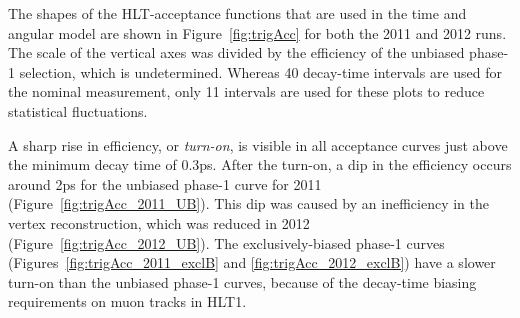 The shapes of the HLT-acceptance functions that are used in the time and angular model are shown in Figure~\ref{fig:trigAcc} for both the
2011 and 2012 runs. The scale of the vertical axes was divided by the efficiency of the unbiased phase-1 selection, which is undetermined.
Whereas 40 decay-time intervals are used for the nominal measurement, only 11 intervals are used for these plots to reduce statistical
fluctuations.

A sharp rise in efficiency, or \emph{turn-on}, is visible in all acceptance curves just above the minimum decay time of 0.3\unitsp{}ps.
After the turn-on, a dip in the efficiency occurs around 2\unitsp{}ps for the unbiased phase-1 curve for 2011
(Figure~\ref{fig:trigAcc_2011_UB}). This dip was caused by an inefficiency in the vertex reconstruction, which was reduced in 2012
(Figure~\ref{fig:trigAcc_2012_UB}). The exclusively-biased phase-1 curves (Figures~\ref{fig:trigAcc_2011_exclB} and
\ref{fig:trigAcc_2012_exclB}) have a slower turn-on than the unbiased phase-1 curves, because of the decay-time biasing requirements on
muon tracks in HLT1.
